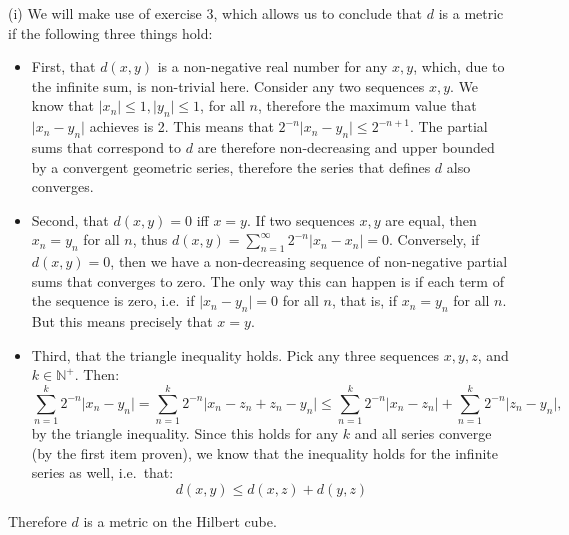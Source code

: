 \begin{solution}
    
    (i) We will make use of exercise 3, which allows us to conclude that $d$ is a metric if the following three things hold:
    \begin{itemize}
        \item First, that $d(x, y)$ is a non-negative real number for any $x, y$, which, due to the infinite sum, is non-trivial here. 
        Consider any two sequences $x, y$. We know that $\lvert x_n \rvert \leq 1, \lvert y_n \rvert \leq 1$, for all $n$, therefore the maximum value that $\lvert x_n - y_n \rvert$ achieves is 2.
        This means that $2^{-n} \lvert x_n - y_n \rvert \leq 2^{-n+1}$.
        The partial sums that correspond to $d$ are therefore non-decreasing and upper bounded by a convergent geometric series, therefore the series that defines $d$ also converges.
        \item Second, that $d(x, y) = 0$ iff $x = y$.
        If two sequences $x, y$ are equal, then $x_n = y_n$ for all $n$, thus $d(x, y) = \sum_{n=1}^{\infty} 2^{-n} \lvert x_n - x_n \rvert = 0$.
        Conversely, if $d(x, y) = 0$, then we have a non-decreasing sequence of non-negative partial sums that converges to zero.
        The only way this can happen is if each term of the sequence is zero, i.e.\ if $\lvert x_n - y_n \rvert = 0$ for all $n$, that is, if $x_n = y_n$ for all $n$.
        But this means precisely that $x = y$.
        \item Third, that the triangle inequality holds.
        Pick any three sequences $x, y, z$, and $k \in \mathbb{N}^+$.
        Then:
        $$\sum_{n = 1}^{k} 2^{-n} \lvert x_n - y_n \rvert = \sum_{n=1}^{k} 2^{-n} \lvert x_n - z_n + z_n - y_n \rvert \leq \sum_{n=1}^{k} 2^{-n} \lvert x_n - z_n \rvert + \sum_{n=1}^{k} 2^{-n} \lvert z_n - y_n \rvert,$$
        by the triangle inequality.
        Since this holds for any $k$ and all series converge (by the first item proven), we know that the inequality holds for the infinite series as well, i.e.\ that:
        $$d(x, y) \leq d(x, z) + d(y, z)$$
    \end{itemize}
    Therefore $d$ is a metric on the Hilbert cube.


\end{solution}
